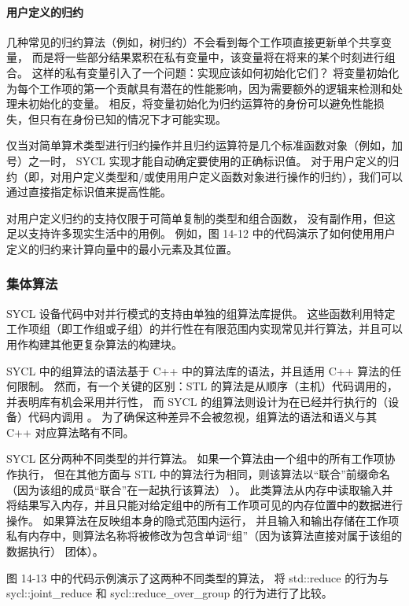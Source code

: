 \paragraph{用户定义的归约}

几种常见的归约算法（例如，树归约）不会看到每个工作项直接更新单个共享变量，
而是将一些部分结果累积在私有变量中，该变量将在将来的某个时刻进行组合。 
这样的私有变量引入了一个问题：实现应该如何初始化它们？ 
将变量初始化为每个工作项的第一个贡献具有潜在的性能影响，因为需要额外的逻辑来检测和处理未初始化的变量。 
相反，将变量初始化为归约运算符的身份可以避免性能损失，但只有在身份已知的情况下才可能实现。

仅当对简单算术类型进行归约操作并且归约运算符是几个标准函数对象（例如，加号）之一时，
SYCL 实现才能自动确定要使用的正确标识值。 
对于用户定义的归约（即，对用户定义类型和/或使用用户定义函数对象进行操作的归约），我们可以通过直接指定标识值来提高性能。

对用户定义归约的支持仅限于可简单复制的类型和组合函数，
没有副作用，但这足以支持许多现实生活中的用例。 
例如，图 14-12 中的代码演示了如何使用用户定义的归约来计算向量中的最小元素及其位置。

\subsubsection{集体算法}
SYCL 设备代码中对并行模式的支持由单独的组算法库提供。 
这些函数利用特定工作项组（即工作组或子组）的并行性在有限范围内实现常见并行算法，并且可以用作构建其他更复杂算法的构建块。

SYCL 中的组算法的语法基于 C++ 中的算法库的语法，并且适用 C++ 算法的任何限制。 
然而，有一个关键的区别：STL 的算法是从顺序（主机）代码调用的，并表明库有机会采用并行性，
而 SYCL 的组算法则设计为在已经并行执行的（设备）代码内调用 。 
为了确保这种差异不会被忽视，组算法的语法和语义与其 C++ 对应算法略有不同。

SYCL 区分两种不同类型的并行算法。 如果一个算法由一个组中的所有工作项协作执行，
但在其他方面与 STL 中的算法行为相同，则该算法以“联合”前缀命名（因为该组的成员“联合”在一起执行该算法） ）。 
此类算法从内存中读取输入并将结果写入内存，并且只能对给定组中的所有工作项可见的内存位置中的数据进行操作。 
如果算法在反映组本身的隐式范围内运行，
并且输入和输出存储在工作项私有内存中，则算法名称将被修改为包含单词“组”（因为该算法直接对属于该组的数据执行） 团体）。

图 14-13 中的代码示例演示了这两种不同类型的算法，
将 std::reduce 的行为与 sycl::joint\_reduce 和 sycl::reduce\_over\_group 的行为进行了比较。

